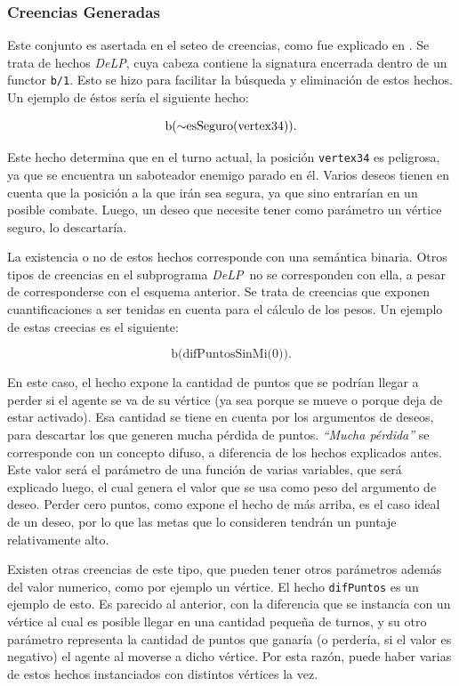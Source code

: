 \documentclass[oneside]{book}
\theoremstyle{definition}
\theoremstyle{example}
\newcommand{\DLP}{\mbox{\textit{DeLP}}}
\newcommand{\no}{\mbox{$\sim$}}
\newcommand{\nlA}[1]{$$\mbox{#1}$$}
\begin{document}
\subsubsection{Creencias Generadas}

Este conjunto es asertada en el seteo de creencias, como fue explicado en %
. Se trata de hechos \DLP, cuya cabeza contiene la signatura encerrada dentro
de un functor \texttt{b/1}. Esto se hizo para facilitar la búsqueda y eliminación de
estos hechos. Un ejemplo de éstos sería el siguiente hecho:

\nlA{b(\no esSeguro(vertex34)).}

Este hecho determina que en el turno actual, la posición \texttt{vertex34} es peligrosa,
ya que se encuentra un saboteador enemigo parado en él. Varios deseos tienen en cuenta
que la posición a la que irán sea segura, ya que sino entrarían en un posible combate.
Luego, un deseo que necesite tener como parámetro un vértice seguro, lo descartaría.

La existencia o no de estos hechos corresponde con una semántica binaria. Otros tipos de
creencias en el subprograma \DLP\ no se corresponden con ella, a pesar de corresponderse
con el esquema anterior. Se trata de creencias que exponen cuantificaciones a ser 
tenidas en cuenta para el cálculo de los pesos. Un ejemplo de estas creecias es el 
siguiente:

\nlA{b(difPuntosSinMi(0)).}

En este caso, el hecho expone la cantidad de puntos que se podrían llegar a perder si el
agente se va de su vértice (ya sea porque se mueve o porque deja de estar activado). Esa
cantidad se tiene en cuenta por los argumentos de deseos, para descartar los que generen
mucha pérdida de puntos. \textit{``Mucha pérdida''} se corresponde con un 
concepto difuso, a diferencia de los hechos explicados antes. Este valor será 
el parámetro de una función de varias variables, que será explicado luego, el 
cual genera el valor que se usa como peso del argumento de deseo. Perder cero 
puntos, como expone el hecho de más arriba, es el caso ideal de un deseo, por 
lo que las metas que lo consideren tendrán un puntaje relativamente alto.

Existen otras creencias de este tipo, que pueden tener otros parámetros además del valor
numerico, como por ejemplo un vértice. El hecho \texttt{difPuntos} es un ejemplo de esto.
Es parecido al anterior, con la diferencia que se instancia con un vértice al cual es
posible llegar en una cantidad pequeña de turnos, y su otro parámetro representa la
cantidad de puntos que ganaría (o perdería, si el valor es negativo) el agente al moverse
a dicho vértice. Por esta razón, puede haber varias de estos hechos instanciados con
distintos vértices la vez.
\end{document}
